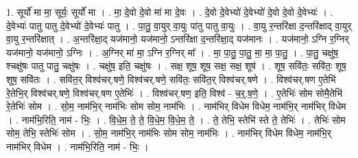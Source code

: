 \documentclass[17pt]{extarticle}
\begin{document}
1. सूर्यो॑ मा मा॒ सूर्यः॒ सूर्यो॑ मा । . मा॒ दे॒वो दे॒वो मा॑ मा दे॒वः । . दे॒वो दे॒वेभ्यो॑ दे॒वेभ्यो॑ दे॒वो दे॒वो दे॒वेभ्यः॑ । . दे॒वेभ्यः॑ पातु पातु दे॒वेभ्यो॑ दे॒वेभ्यः॑ पातु । . पा॒तु॒ वा॒युर् वा॒युः पा॑तु पातु वा॒युः । . वा॒यु र॒न्तरि॑क्षा द॒न्तरि॑क्षाद् वा॒युर् वा॒यु र॒न्तरि॑क्षात् । . अ॒न्तरि॑क्षा॒द् यज॑मानो॒ यज॑मानो॒ ऽन्तरि॑क्षा द॒न्तरि॑क्षा॒द् यज॑मानः । . यज॑मानो॒ ऽग्नि र॒ग्निर् यज॑मानो॒ यज॑मानो॒ ऽग्निः । . अ॒ग्निर् मा॑ मा॒ ऽग्नि र॒ग्निर् मा᳚ । . मा॒ पा॒तु॒ पा॒तु॒ मा॒ मा॒ पा॒तु॒ । . पा॒तु॒ चक्षु॑ष॒ श्चक्षु॑षः पातु पातु॒ चक्षु॑षः । . चक्षु॑ष॒ इति॒ चक्षु॑षः । . सक्ष॒ शूष॒ शूष॒ सक्ष॒ सक्ष॒ शूष॑ । . शूष॒ सवि॑तः॒ सवि॑तः॒ शूष॒ शूष॒ सवि॑तः । . सवि॑त॒र् विश्व॑चर्.षणे॒ विश्व॑चर्.षणे॒ सवि॑तः॒ सवि॑त॒र् विश्व॑चर्.षणे । . विश्व॑चर्.षण ए॒तेभि॑ रे॒तेभि॒र् विश्व॑चर्.षणे॒ विश्व॑चर्.षण ए॒तेभिः॑ । . विश्व॑चर्.षण॒ इति॒ विश्व॑ - च॒र्॒.ष॒णे॒ । . ए॒तेभिः॑ सोम सोमै॒तेभि॑ रे॒तेभिः॑ सोम । . सो॒म॒ नाम॑भि॒र् नाम॑भिः सोम सोम॒ नाम॑भिः । . नाम॑भिर् विधेम विधेम॒ नाम॑भि॒र् नाम॑भिर् विधेम । . नाम॑भि॒रिति॒ नाम॑ - भिः॒ । . वि॒धे॒म॒ ते॒ ते॒ वि॒धे॒म॒ वि॒धे॒म॒ ते॒ । . ते॒ तेभि॒ स्तेभि॑ स्ते ते॒ तेभिः॑ । . तेभिः॑ सोम सोम॒ तेभि॒ स्तेभिः॑ सोम । . सो॒म॒ नाम॑भि॒र् नाम॑भिः सोम सोम॒ नाम॑भिः । . नाम॑भिर् विधेम विधेम॒ नाम॑भि॒र् नाम॑भिर् विधेम । . नाम॑भि॒रिति॒ नाम॑ - भिः॒ । \newline
\end{document}
